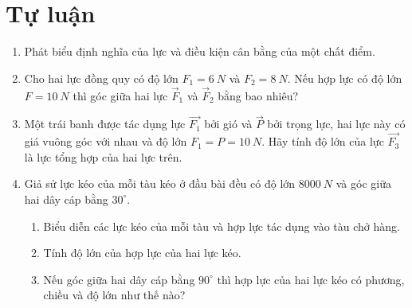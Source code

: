 \section{Tự luận}
\begin{enumerate}[label=\bfseries Câu \arabic*:]
	\item {}
	
	{
		Phát biểu định nghĩa của lực và điều kiện cân bằng của một chất điểm.
	}
	
	\item {}
	
	{
		Cho hai lực đồng quy có độ lớn $F_1 = \SI{6}{N}$ và $F_2 = \SI{8}{N}$. Nếu hợp lực có độ lớn $F = \SI{10}{N}$ thì góc giữa hai lực $\vec F_1$ và $\vec F_2$ bằng bao nhiêu?
	}
	

	\item {}
	
	{ Một trái banh được tác dụng lực $\vec{F_1}$ bởi gió và $\vec{P}$ bởi trọng lực, hai lực này có giá vuông góc với nhau và độ lớn $F_1=P=\SI{10}{N}$. Hãy tính độ lớn của lực $\vec{F_3}$ là lực tổng hợp của hai lực trên.
		
	}
	\item {}
	
	{Giả sử lực kéo của mỗi tàu kéo ở đầu bài đều có độ lớn $\SI{8000}{N}$ và góc giữa hai dây cáp bằng $30^\circ$. 
		\begin{enumerate}[label=\alph*)]
			\item Biểu diễn các lực kéo của mỗi tàu và hợp lực tác dụng vào tàu chở hàng.
			\item Tính độ lớn của hợp lực của hai lực kéo.
			\item Nếu góc giữa hai dây cáp bằng $90^\circ$ thì hợp lực của hai lực kéo có phương, chiều và độ lớn như thế nào?
		\end{enumerate}
		
}
\end{enumerate}
